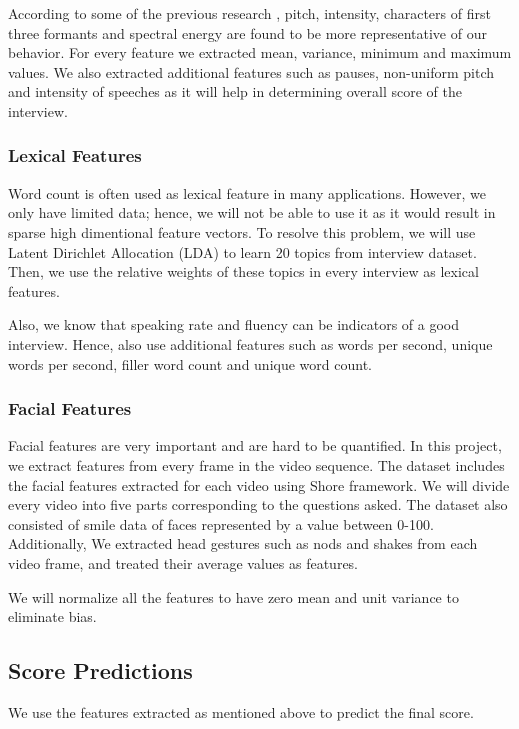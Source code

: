 \documentclass[11pt]{article}
\begin{document}
According to some of the previous research \cite{frick1985communicating}, pitch, intensity, characters of first three formants and spectral energy are found to be more representative of our behavior. For every feature we extracted mean, variance, minimum and maximum values. We also extracted additional features such as pauses, non-uniform pitch and intensity of speeches as it will help in determining overall score of the interview.
\subsubsection{Lexical Features}
Word count is often used as lexical feature in many applications. However, we only have limited data; hence, we will not be able to use it as it would result in sparse high dimentional feature vectors. To resolve this problem, we will use Latent Dirichlet Allocation (LDA) to learn 20 topics from interview dataset. Then, we use the relative weights of these topics in every interview as lexical features.

Also, we know that speaking rate and fluency can be indicators of a good interview. Hence, also use additional features such as words per second, unique words per second, filler word count and unique word count. 
\subsubsection{Facial Features}
Facial features are very important and are hard to be quantified. In this project, we extract features from every frame in the video sequence. The dataset includes the facial features extracted for each video using Shore framework. We will divide every video into five parts corresponding to the questions asked. The dataset also consisted of smile data of faces represented by a value between 0-100. Additionally, We extracted head gestures such as nods and shakes from each video frame, and treated their average values as features.

We will normalize all the features to have zero mean and unit variance to eliminate bias.

\subsection{Score Predictions}
We use the features extracted as mentioned above to predict the final score.
\end{document}
